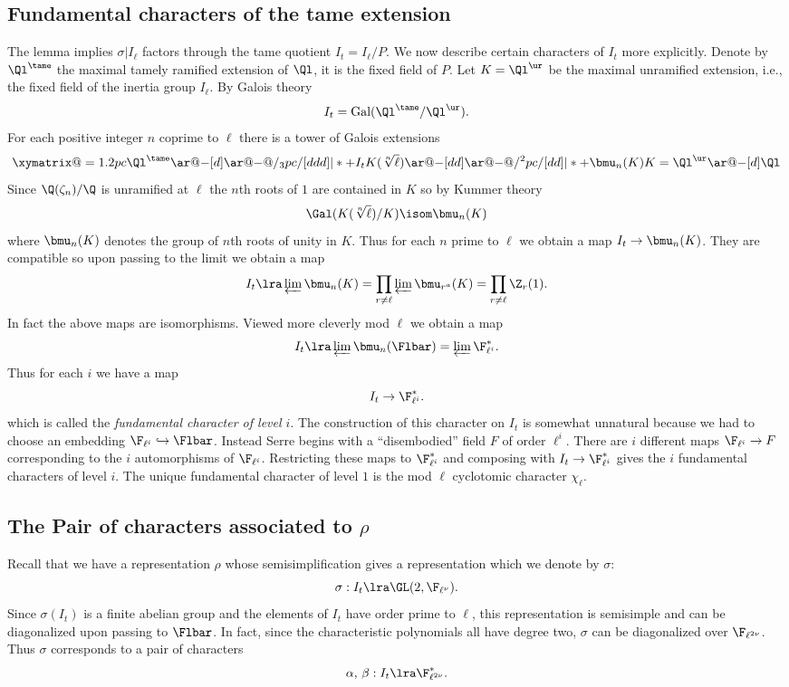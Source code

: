\documentclass{report}
\begin{document}
\subsection{Fundamental characters of the tame extension}

The lemma implies $\sigma|I_{\ell}$ factors through the tame quotient
$I_t=I_{\ell}/P$.  We now describe certain characters of
$I_t$ more explicitly.   Denote by
$\Ql^{\tame}$ the maximal tamely ramified extension of
$\Ql$, it is the fixed field of $P$.
Let $K=\Ql^{\ur}$ be the maximal unramified extension, i.e.,
the fixed field of the inertia group $I_{\ell}$.
By Galois theory
    $$I_t=\mbox{\rm Gal}(\Ql^{\tame}/\Ql^{\ur}).$$
For each positive integer $n$ coprime to $\ell$ there is a
tower of Galois extensions
$$\xymatrix@=1.2pc{
{\Ql^{\tame}}\ar@{-}[d] \ar@{-}@/_3pc/[ddd]|*+{I_t}\\
{K(\protect{\sqrt[n]{\ell}})}\ar@{-}[dd]\ar@{-}@/^2pc/[dd]|*+{\bmu_n(K)}\\
\\
{K=\Ql^{\ur}}\ar@{-}[d]\\
{\Ql}}$$
Since $\Q(\zeta_n)/\Q$ is unramified at $\ell$
the $n$th roots of $1$ are contained in $K$ so by
Kummer theory
 $$\Gal(K(\sqrt[n]{\ell})/K)\isom \bmu_n(K)$$
where $\bmu_n(K)$ denotes the group of $n$th roots of unity in $K$.
Thus for each $n$ prime to $\ell$ we obtain a map
$I_t\rightarrow\bmu_n(K)$.
They are compatible so upon passing to the limit we obtain a map
$$I_t\lra \varprojlim \bmu_n(K)
        =\prod_{r\neq \ell}\varprojlim\bmu_{r^a}(K)
        =\prod_{r\neq \ell}\Z_r(1).$$
In fact \cite[8, Corollary 3]{frohlich:local} the above
maps are isomorphisms.
Viewed more cleverly mod $\ell$ we obtain a map
$$I_t\lra \varprojlim \bmu_n(\Flbar)
      = \varprojlim \F_{\ell^i}^*.$$
Thus for each $i$ we have a map
       $$I_t\rightarrow\F_{\ell^i}^*.$$
which is called the {\em fundamental character of level $i$}.
The construction of this character on $I_t$
is somewhat unnatural because we had to choose an embedding
$\F_{\ell^i}\hookrightarrow \Flbar$. Instead Serre
begins with a  ``disembodied'' field $F$ of order $\ell^i$.
There are $i$ different maps $\F_{\ell^i}\rightarrow F$ corresponding to the
$i$ automorphisms of $\F_{\ell^i}$. Restricting these maps to $\F_{\ell^i}^*$
and composing with $I_t\rightarrow\F_{\ell^i}^*$
gives the $i$ fundamental characters of level $i$.
The unique fundamental character of level $1$ is
the mod $\ell$ cyclotomic character $\chi_{\ell}$.


\subsection{The Pair of characters associated to $\rho$}
Recall that we have a representation $\rho$ whose semisimplification
gives a representation which we
denote by $\sigma$:
   $$\sigma:I_t\lra \GL(2,\F_{\ell^{\nu}}).$$
Since $\sigma(I_t)$ is a finite abelian group and
the elements of $I_t$ have order prime to $\ell$,
this representation is semisimple and can be
diagonalized upon passing to $\Flbar$.  In fact,
since the characteristic polynomials all have degree
two, $\sigma$ can be diagonalized over $\F_{\ell^{2\nu}}$.
Thus $\sigma$ corresponds to a pair of characters
$$\alpha,\,\beta:I_t\lra\F_{\ell^{2\nu}}^*.$$
\end{document}
